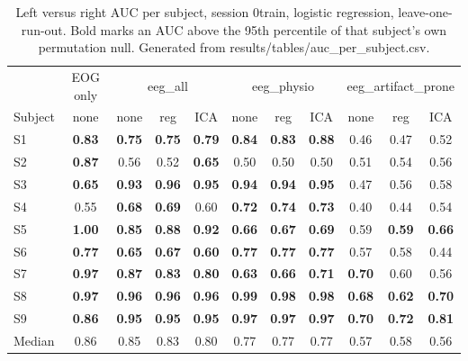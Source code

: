 \begin{table}[t]
\caption{Left versus right AUC per subject, session 0train, logistic regression, leave-one-run-out. Bold marks an AUC above the 95th percentile of that subject's own permutation null. Generated from results/tables/auc\_per\_subject.csv.}
\label{tab:persubject}
\centering
\small
\begin{tabular}{@{}l c ccc ccc ccc@{}}
\toprule
 & EOG only & \multicolumn{3}{c}{eeg\_all} & \multicolumn{3}{c}{eeg\_physio} & \multicolumn{3}{c}{eeg\_artifact\_prone}\\
\cmidrule(lr){3-5}\cmidrule(lr){6-8}\cmidrule(l){9-11}
Subject & none & none & reg & ICA & none & reg & ICA & none & reg & ICA\\
\midrule
S1 & \textbf{0.83} & \textbf{0.75} & \textbf{0.75} & \textbf{0.79} & \textbf{0.84} & \textbf{0.83} & \textbf{0.88} & 0.46 & 0.47 & 0.52 \\
S2 & \textbf{0.87} & 0.56 & 0.52 & \textbf{0.65} & 0.50 & 0.50 & 0.50 & 0.51 & 0.54 & 0.56 \\
S3 & \textbf{0.65} & \textbf{0.93} & \textbf{0.96} & \textbf{0.95} & \textbf{0.94} & \textbf{0.94} & \textbf{0.95} & 0.47 & 0.56 & 0.58 \\
S4 & 0.55 & \textbf{0.68} & \textbf{0.69} & 0.60 & \textbf{0.72} & \textbf{0.74} & \textbf{0.73} & 0.40 & 0.44 & 0.54 \\
S5 & \textbf{1.00} & \textbf{0.85} & \textbf{0.88} & \textbf{0.92} & \textbf{0.66} & \textbf{0.67} & \textbf{0.69} & 0.59 & \textbf{0.59} & \textbf{0.66} \\
S6 & \textbf{0.77} & \textbf{0.65} & \textbf{0.67} & \textbf{0.60} & \textbf{0.77} & \textbf{0.77} & \textbf{0.77} & 0.57 & 0.58 & 0.44 \\
S7 & \textbf{0.97} & \textbf{0.87} & \textbf{0.83} & \textbf{0.80} & \textbf{0.63} & \textbf{0.66} & \textbf{0.71} & \textbf{0.70} & 0.60 & 0.56 \\
S8 & \textbf{0.97} & \textbf{0.96} & \textbf{0.96} & \textbf{0.96} & \textbf{0.99} & \textbf{0.98} & \textbf{0.98} & \textbf{0.68} & \textbf{0.62} & \textbf{0.70} \\
S9 & \textbf{0.86} & \textbf{0.95} & \textbf{0.95} & \textbf{0.95} & \textbf{0.97} & \textbf{0.97} & \textbf{0.97} & \textbf{0.70} & \textbf{0.72} & \textbf{0.81} \\
\midrule
Median & 0.86 & 0.85 & 0.83 & 0.80 & 0.77 & 0.77 & 0.77 & 0.57 & 0.58 & 0.56 \\
\bottomrule
\end{tabular}
\end{table}
